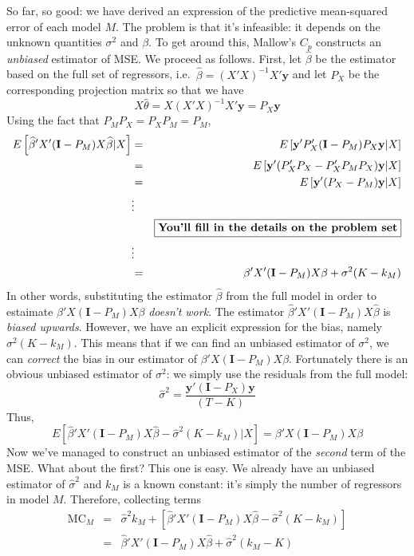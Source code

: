 \documentclass[12pt]{article}
\theoremstyle{definition}
\begin{document}
So far, so good: we have derived an expression of the predictive mean-squared error of each model $M$. The problem is that it's infeasible: it depends on the unknown quantities $\sigma^2$ and $\beta$. To get around this, Mallow's $C_p$ constructs an \emph{unbiased} estimator of MSE. We proceed as follows. First, let $\widehat{\beta}$ be the estimator based on the full set of regressors, i.e.\ $\widehat{\beta} = (X'X)^{-1}X'\mathbf{y}$ and let $P_{X}$ be the corresponding projection matrix so that we have 
		$$X \widehat{\theta} = X(X'X)^{-1}X'\mathbf{y} = P_{X}\mathbf{y}$$
Using the fact that $P_MP_X = P_XP_M = P_M$, 
	\begin{eqnarray*}
		E\left[\widehat{\beta}'X'(\mathbf{I} - P_M)X\widehat{\beta} |X\right] &=& E\left[\mathbf{y}'P_X'(\mathbf{I} - P_M)P_{X}\mathbf{y} |X\right]\\
			&=& E\left[\mathbf{y}'(P_X'P_X - P_X'P_MP_X)\mathbf{y} |X\right]\\
			&=& E\left[\mathbf{y}'(P_X - P_M)\mathbf{y} |X\right]\\
			&\vdots& \\
			&&\boxed{\mbox{\textbf{You'll fill in the details on the problem set}}}\\  
			&\vdots& \\
			&=& \beta'X'(\mathbf{I}- P_M)X\beta +  \sigma^2 (K - k_M) 
	\end{eqnarray*}
In other words, substituting the estimator $\widehat{\beta}$ from the full model in order to estaimate $\beta'X(\mathbf{I}- P_M)X\beta$ \emph{doesn't work}. The estimator $\widehat{\beta}'X'(\mathbf{I} - P_M)X\widehat{\beta}$ is \emph{biased upwards}. However, we have an explicit expression for the bias, namely $\sigma^2 (K - k_M)$. This means that if we can find an unbiased estimator of $\sigma^2$, we can \emph{correct} the bias in our estimator of $\beta'X(\mathbf{I}- P_M)X\beta$. Fortunately there is an obvious unbiased estimator of $\sigma^2$: we simply use the residuals from the full model:
	$$\widehat{\sigma}^2 = \frac{\mathbf{y}'(\mathbf{I} - P_X)\mathbf{y}}{(T-K)}$$
Thus, 
	$$E[\widehat{\beta}'X'(\mathbf{I} - P_M)X\widehat{\beta} - \widehat{\sigma}^2(K- k_M) |X ] = \beta'X(\mathbf{I}- P_M)X\beta$$ 
Now we've managed to construct an unbiased estimator of the \emph{second} term of the MSE. What about the first? This one is easy. We already have an unbiased estimator of $\widehat{\sigma}^2$ and $k_M$ is a known constant: it's simply the number of regressors in model $M$. Therefore, collecting terms
	\begin{eqnarray*}
		\mbox{MC}_M &=& \widehat{\sigma}^2 k_M + \left[\widehat{\beta}'X'(\mathbf{I} - P_M)X\widehat{\beta} - \widehat{\sigma}^2(K- k_M) \right]\\
			&=& \widehat{\beta}'X'(\mathbf{I} - P_M)X\widehat{\beta} + \widehat{\sigma}^2 (k_M - K)
	\end{eqnarray*}
\end{document}
